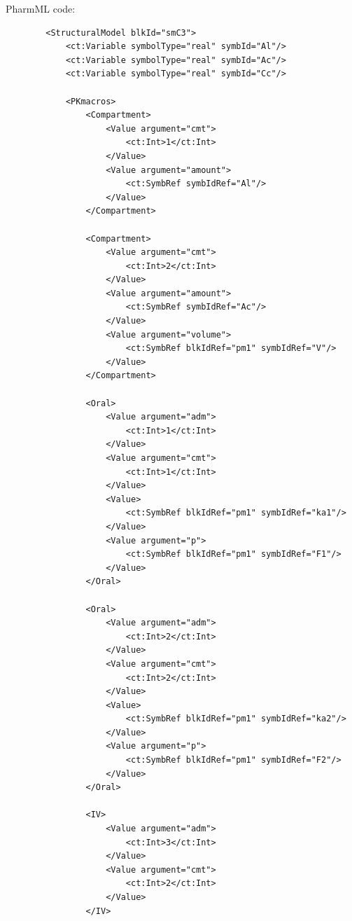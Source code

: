 PharmML code:
\lstset{language=XML}
\begin{lstlisting}
        <StructuralModel blkId="smC3">
            <ct:Variable symbolType="real" symbId="Al"/>
            <ct:Variable symbolType="real" symbId="Ac"/>
            <ct:Variable symbolType="real" symbId="Cc"/>
            
            <PKmacros>
                <Compartment>
                    <Value argument="cmt">
                        <ct:Int>1</ct:Int>
                    </Value>
                    <Value argument="amount">
                        <ct:SymbRef symbIdRef="Al"/>
                    </Value>
                </Compartment>
                
                <Compartment>
                    <Value argument="cmt">
                        <ct:Int>2</ct:Int>
                    </Value>
                    <Value argument="amount">
                        <ct:SymbRef symbIdRef="Ac"/>
                    </Value>
                    <Value argument="volume">
                        <ct:SymbRef blkIdRef="pm1" symbIdRef="V"/>
                    </Value>
                </Compartment>
                
                <Oral>
                    <Value argument="adm">
                        <ct:Int>1</ct:Int>
                    </Value>
                    <Value argument="cmt">
                        <ct:Int>1</ct:Int>
                    </Value>
                    <Value>
                        <ct:SymbRef blkIdRef="pm1" symbIdRef="ka1"/>
                    </Value>
                    <Value argument="p">
                        <ct:SymbRef blkIdRef="pm1" symbIdRef="F1"/>
                    </Value>
                </Oral>
                
                <Oral>
                    <Value argument="adm">
                        <ct:Int>2</ct:Int>
                    </Value>
                    <Value argument="cmt">
                        <ct:Int>2</ct:Int>
                    </Value>
                    <Value>
                        <ct:SymbRef blkIdRef="pm1" symbIdRef="ka2"/>
                    </Value>
                    <Value argument="p">
                        <ct:SymbRef blkIdRef="pm1" symbIdRef="F2"/>
                    </Value>
                </Oral>
                
                <IV>
                    <Value argument="adm">
                        <ct:Int>3</ct:Int>
                    </Value>
                    <Value argument="cmt">
                        <ct:Int>2</ct:Int>
                    </Value>
                </IV>
                

\end{lstlisting}
